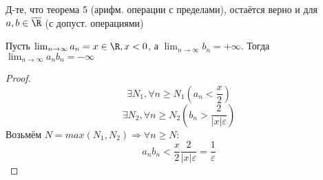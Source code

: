 \begin{task}
Д-те, что теорема 5 (арифм. операции с пределами), остаётся верно и для $a, b \in \overline{\R}$ (с допуст. операциями)
\end{task}
\begin{example}
Пусть $\lim_{n\to\infty} a_n = x \in \R, x < 0$, а $\lim_{n\to\infty} b_n = +\infty$. Тогда $\lim_{n\to\infty} a_n b_n = -\infty$
\end{example}
\begin{proof}
  \[
    \exists N_1, \forall n \geq N_1 (a_n < \frac{x}{2})
  \]
  \[
  \exists N_2, \forall n \geq N_2 (b_n > \frac{2}{\left|x\right|\varepsilon})
  \]
  Возьмём $N = max(N_1, N_2) \Rightarrow \forall n \geq N \colon$
  \[
  a_nb_n < \frac{x}{2} \frac{2}{\left|x\right|\varepsilon} = \frac{1}{\varepsilon}
  \]
\end{proof}
